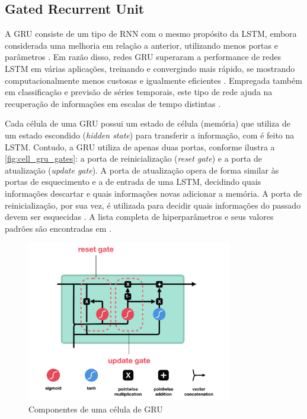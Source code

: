 \subsection{Gated Recurrent Unit}

A GRU consiste de um tipo de RNN com o mesmo propósito da LSTM, embora considerada uma melhoria em relação a anterior, utilizando menos portas e parâmetros \cite{Kumar2019,Bianchi2017}. Em razão disso, redes GRU superaram a performance de redes LSTM em várias aplicações, treinando e convergindo mais rápido, se mostrando computacionalmente menos custosas e igualmente eficientes \cite{Kumar2019,Bianchi2017}. Empregada também em classificação e previsão de séries temporais, este tipo de rede ajuda na recuperação de informações em escalas de tempo distintas \cite{Bianchi2017,Kumar2019}. 

Cada célula de uma GRU possui um estado de célula (memória) que utiliza de um estado escondido (\textit{hidden state}) para transferir a informação, com é feito na LSTM. Contudo, a GRU utiliza de apenas duas portas, conforme ilustra a \autoref{fig:cell_gru_gates}: a porta de reinicialização (\textit{reset gate}) e a porta de atualização (\textit{update gate}). A porta de atualização opera de forma similar às portas de esquecimento e a de entrada de uma LSTM, decidindo quais informações descartar e quais informações novas adicionar a memória. A porta de reinicialização, por sua vez, é utilizada para decidir quais informações do passado devem ser esquecidas \cite{Phi2020}. A lista completa de hiperparâmetros e seus valores padrões são encontradas em .

\begin{figure}[h]
  \centering
  \caption{Componentes de uma célula de GRU}
   \label{fig:cell_gru_gates}
   \includegraphics[width=0.8\textwidth]{figuras/fig_10.png}
\end{figure}

